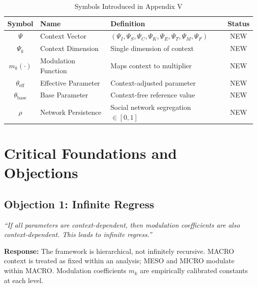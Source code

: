 \begin{table}[htbp]
\centering
\caption{Symbols Introduced in Appendix V}
\label{tab:when-symbols}
\renewcommand{\arraystretch}{1.3}
\begin{tabular}{@{}clp{5cm}c@{}}
\toprule
\textbf{Symbol} & \textbf{Name} & \textbf{Definition} & \textbf{Status} \\
\midrule
$\Psi$ & Context Vector & $(\Psi_I, \Psi_S, \Psi_C, \Psi_K, \Psi_E, \Psi_T, \Psi_M, \Psi_F)$ & NEW \\
$\Psi_k$ & Context Dimension & Single dimension of context & NEW \\
$m_k(\cdot)$ & Modulation Function & Maps context to multiplier & NEW \\
$\theta_{\text{eff}}$ & Effective Parameter & Context-adjusted parameter & NEW \\
$\theta_{\text{base}}$ & Base Parameter & Context-free reference value & NEW \\
$\rho$ & Network Persistence & Social network segregation $\in [0,1]$ & NEW \\
\bottomrule
\end{tabular}
\end{table}


\section{Critical Foundations and Objections}
\label{sec:when-critical}

\subsection{Objection 1: Infinite Regress}

\begin{tcolorbox}[colback=red!5!white, colframe=red!50!black,
    title=Objection: Context Depends on Context]
\textit{``If all parameters are context-dependent, then modulation coefficients
are also context-dependent. This leads to infinite regress.''}
\end{tcolorbox}

\textbf{Response:}
The framework is hierarchical, not infinitely recursive. MACRO context is treated
as fixed within an analysis; MESO and MICRO modulate within MACRO. Modulation
coefficients $m_k$ are empirically calibrated constants at each level.

